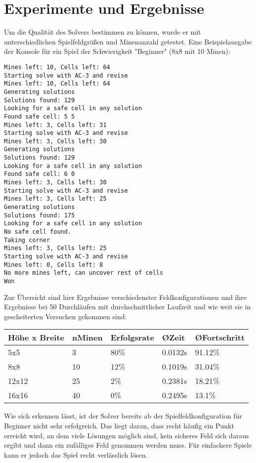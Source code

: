%
\graphicspath{{chapters/images/}}
\section{Experimente und Ergebnisse}

Um die Qualität des Solvers bestimmen zu können, wurde er mit unterschiedlichen Spielfeldgrößen und Minenanzahl getestet. Eine Beispielausgabe
der Konsole für ein Spiel der Schwierigkeit "Beginner" (8x8 mit 10 Minen):
\begin{lstlisting}[basicstyle=\tiny]
Mines left: 10, Cells left: 64
Starting solve with AC-3 and revise
Mines left: 10, Cells left: 64
Generating solutions
Solutions found: 129
Looking for a safe cell in any solution
Found safe cell: 5 5
Mines left: 3, Cells left: 31
Starting solve with AC-3 and revise
Mines left: 3, Cells left: 30
Generating solutions
Solutions found: 129
Looking for a safe cell in any solution
Found safe cell: 6 0
Mines left: 3, Cells left: 30
Starting solve with AC-3 and revise
Mines left: 3, Cells left: 25
Generating solutions
Solutions found: 175
Looking for a safe cell in any solution
No safe cell found.
Taking corner
Mines left: 3, Cells left: 25
Starting solve with AC-3 and revise
Mines left: 0, Cells left: 8
No more mines left, can uncover rest of cells
Won
\end{lstlisting}
\clearpage
Zur Übersicht sind hier Ergebnisse verschiedenster Feldkonfigurationen und ihre Ergebnisse bei 50 Durchläufen mit durchschnittlicher Laufzeit
und wie weit sie in gescheiterten Versuchen gekommen sind:\\

\begin{tabular}{ |p{3cm}|p{2cm}|p{2cm}|p{2cm}|p{2cm}|  }
    \hline
    Höhe x Breite& nMinen& Erfolgsrate &\O Zeit&\O Fortschritt\\
    \hline
    5x5     &3  & 80\%  & 0.0132s   & 91.12\%\\
    8x8     &10 & 12\%  & 0.1019s   & 31.04\%\\
    12x12   &25 & 2\%   & 0.2381s   & 18.21\%\\
    16x16   &40 & 0\%   & 0.2495s   & 13.1\%\\
    \hline
\end{tabular}

Wie sich erkennen lässt, ist der Solver bereits ab der Spielfeldkonfiguration für Beginner nicht sehr erfolgreich. Das liegt daran, dass recht häufig
ein Punkt erreicht wird, an dem viele Lösungen möglich sind, kein sicheres Feld sich daraus ergibt und dann ein zufälliges Feld genommen werden muss.
Für einfachere Spiele kann er jedoch das Spiel recht verlässlich lösen.